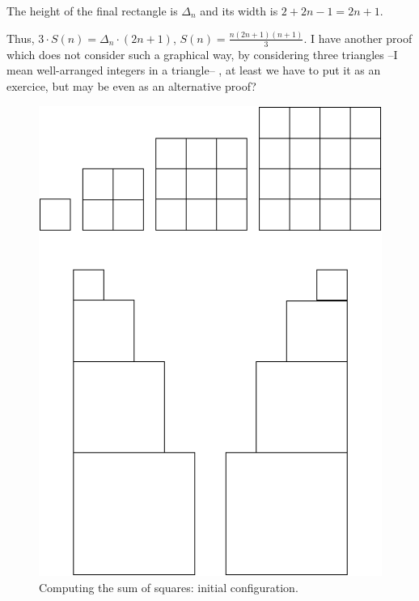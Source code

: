The height of the final rectangle is $\Delta_ n$ and its width is $2+2n-1=2n+1$. 

Thus, $3 \cdot S(n) = \Delta_n \cdot (2n+1)$, $S(n) = \frac{n(2n+1)(n+1)}{3}$.
{\Denis I have another proof which does not consider such a graphical way, by considering three triangles --I mean well-arranged integers in a triangle-- , at least we have to put it as an exercice,
but may be even as an alternative proof?}
\begin{figure}[ht]
\begin{center}
       \includegraphics[scale=0.4]{FiguresMaths/SumSquares1}
\caption{Computing the sum of squares: initial configuration.}
       \label{fig:sumSquares1}
\end{center}
\end{figure}
